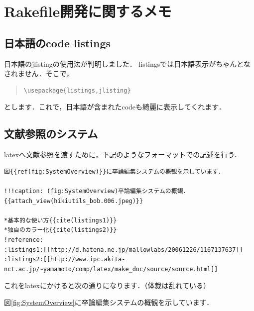 \section{Rakefile開発に関するメモ}
\subsection{日本語のcode listings}
日本語のjlistingの使用法が判明しました．
listingsでは日本語表示がちゃんとなされません．そこで，
\begin{quote}\begin{verbatim}
\usepackage{listings,jlisting}
\end{verbatim}\end{quote}
とします．これで，日本語が含まれたcodeも綺麗に表示してくれます．

\subsection{文献参照のシステム}
latexへ文献参照を渡すために，下記のようなフォーマットでの記述を行う．
\begin{lstlisting}[style=customCsh,basicstyle={\scriptsize\ttfamily}]
図{{ref(fig:SystemOverview)}}に卒論編集システムの概観を示しています．

!!!caption: (fig:SystemOverview)卒論編集システムの概観．
{{attach_view(hikiutils_bob.006.jpeg)}}

*基本的な使い方{{cite(listings1)}}
*独自のカラー化{{cite(listings2)}}
!reference:
:listings1:[[http://d.hatena.ne.jp/mallowlabs/20061226/1167137637]]
:listings2:[[http://www.ipc.akita-nct.ac.jp/~yamamoto/comp/latex/make_doc/source/source.html]]
\end{lstlisting}
これをlatexにかけると次の通りになります．（体裁は乱れている）

図\ref{fig:SystemOverview}に卒論編集システムの概観を示しています．

